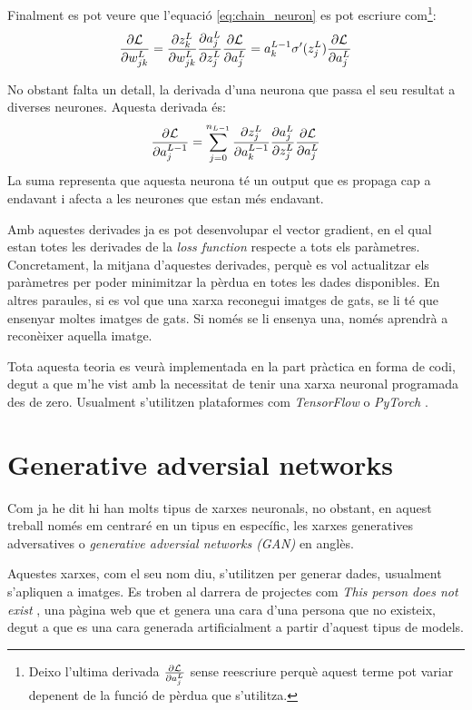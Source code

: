 Finalment es pot veure que l'equació \ref{eq:chain_neuron} es pot escriure com\footnote{Deixo l'ultima derivada $\pdv{\mathcal{L}}{a_j^L}$ sense reescriure perquè aquest terme pot variar depenent de la funció de pèrdua que s'utilitza.}:
$$
	\pdv{\mathcal{L}}{w_{jk}^L} = \pdv{z_k^L}{w_{jk}^L}\pdv{a_j^L}{z_j^L}\pdv{\mathcal{L}}{a_j^L} = 
	a^{L-1}_k \sigma'(z_j^L)\pdv{\mathcal{L}}{a_j^L}
$$

No obstant falta un detall, la derivada d'una neurona que passa el seu resultat a diverses neurones. Aquesta derivada és:
$$
\pdv{\mathcal{L}}{a_j^{L-1}} = \sum_{j=0}^{n_{L-1}} \pdv{z_j^L}{a_k^{L-1}}\pdv{a_j^L}{z_j^L}\pdv{\mathcal{L}}{a_j^L}
$$
La suma representa que aquesta neurona té un output que es propaga cap a endavant i afecta a les neurones que estan més endavant. 

Amb aquestes derivades ja es pot desenvolupar el vector gradient, en el qual estan totes les derivades de la \textit{loss function} respecte a tots els paràmetres. Concretament, la mitjana d'aquestes derivades, perquè es vol actualitzar els paràmetres per poder minimitzar la pèrdua en totes les dades disponibles. En altres paraules, si es vol que una xarxa reconegui imatges de gats, se li té que ensenyar moltes imatges de gats. Si només se li ensenya una, només aprendrà a reconèixer aquella imatge. 

Tota aquesta teoria es veurà implementada en la part pràctica en forma de codi, degut a que m'he vist amb la necessitat de tenir una xarxa neuronal programada des de zero. Usualment s'utilitzen plataformes com \textit{TensorFlow} \cite{tensorflow2015-whitepaper} o \textit{PyTorch} \cite{pytorch_2019}.

\section{Generative adversial networks}
Com ja he dit hi han molts tipus de xarxes neuronals, no obstant, en aquest treball només em centraré en un tipus en específic, les xarxes generatives adversatives o \textit{generative adversial networks (GAN)} en anglès.

Aquestes xarxes, com el seu nom diu, s'utilitzen per generar dades, usualment s'apliquen a imatges. Es troben al darrera de projectes com \textit{This person does not exist} \cite{styleGAN, this_person_does_not_exist}, una pàgina web que et genera una cara d'una persona que no existeix, degut a que es una cara generada artificialment a partir d'aquest tipus de models.

